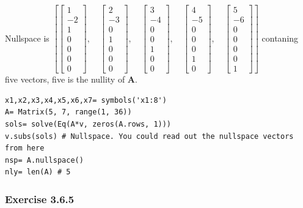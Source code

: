 Nullspace is
$
\left [ \left[\begin{matrix}1\\-2\\1\\0\\0\\0\\0\end{matrix}\right], \quad
        \left[\begin{matrix}2\\-3\\0\\1\\0\\0\\0\end{matrix}\right], \quad
        \left[\begin{matrix}3\\-4\\0\\0\\1\\0\\0\end{matrix}\right], \quad
        \left[\begin{matrix}4\\-5\\0\\0\\0\\1\\0\end{matrix}\right], \quad
        \left[\begin{matrix}5\\-6\\0\\0\\0\\0\\1\end{matrix}\right]\right ]
$ contaning five vectors, five is the nullity of \textbf{A}.

\begin{verbatim}
x1,x2,x3,x4,x5,x6,x7= symbols('x1:8')
A= Matrix(5, 7, range(1, 36))
sols= solve(Eq(A*v, zeros(A.rows, 1)))
v.subs(sols) # Nullspace. You could read out the nullspace vectors from here
nsp= A.nullspace()
nly= len(A) # 5
\end{verbatim}

\subsubsection{Exercise 3.6.5}

